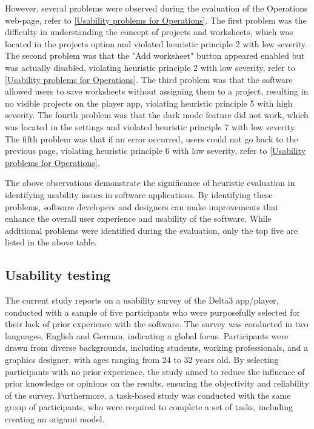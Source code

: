 \documentclass[conference,onecolumn]{IEEEtran}
\begin{document}
            However, several problems were observed during the evaluation of the Operations web-page, refer to \tablename{ \ref{Usability problems for Operations}}. The first problem was the difficulty in understanding the concept of projects and worksheets, which was located in the projects option and violated heuristic principle 2 with low severity. The second problem was that the "Add worksheet" button appeared enabled but was actually disabled, violating heuristic principle 2 with low severity, refer to \tablename{ \ref{Usability problems for Operations}}. The third problem was that the software allowed users to save worksheets without assigning them to a project, resulting in no visible projects on the player app, violating heuristic principle 5 with high severity. The fourth problem was that the dark mode feature did not work, which was located in the settings and violated heuristic principle 7 with low severity. The fifth problem was that if an error occurred, users could not go back to the previous page, violating heuristic principle 6 with low severity, refer to \tablename{ \ref{Usability problems for Operations}}.

            The above observations demonstrate the significance of heuristic evaluation in identifying usability issues in software applications. By identifying these problems, software developers and designers can make improvements that enhance the overall user experience and usability of the software. While additional problems were identified during the evaluation, only the top five are listed in the above table.

    \subsection{Usability testing}   

        The current study reports on a usability survey of the Delta3 app/player, conducted with a sample of five participants who were purposefully selected for their lack of prior experience with the software. The survey was conducted in two languages, English and German, indicating a global focus. Participants were drawn from diverse backgrounds, including students, working professionals, and a graphics designer, with ages ranging from 24 to 32 years old. By selecting participants with no prior experience, the study aimed to reduce the influence of prior knowledge or opinions on the results, ensuring the objectivity and reliability of the survey. Furthermore, a task-based study was conducted with the same group of participants, who were required to complete a set of tasks, including creating an origami model.
        
\end{document}
